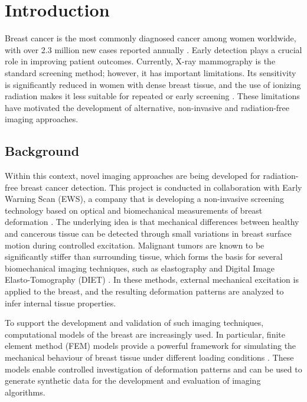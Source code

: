 \section{Introduction}

Breast cancer is the most commonly diagnosed cancer among women worldwide, with over 2.3 million new cases reported annually \cite{WHO2025}. Early detection plays a crucial role in improving patient outcomes. Currently, X-ray mammography is the standard screening method; however, it has important limitations. Its sensitivity is significantly reduced in women with dense breast tissue, and the use of ionizing radiation makes it less suitable for repeated or early screening \cite{VonEuler-Chelpin2019, Bakker2019}. These limitations have motivated the development of alternative, non-invasive and radiation-free imaging approaches.

\subsection{Background}

Within this context, novel imaging approaches are being developed for radiation-free breast cancer detection. This project is conducted in collaboration with Early Warning Scan (EWS), a company that is developing a non-invasive screening technology based on optical and biomechanical measurements of breast deformation \cite{EarlyWarningScanWebsite}. The underlying idea is that mechanical differences between healthy and cancerous tissue can be detected through small variations in breast surface motion during controlled excitation. Malignant tumors are known to be significantly stiffer than surrounding tissue, which forms the basis for several biomechanical imaging techniques, such as elastography and Digital Image Elasto-Tomography (DIET) \cite{Samani2007, Patel2022, Peters2004}. In these methods, external mechanical excitation is applied to the breast, and the resulting deformation patterns are analyzed to infer internal tissue properties.

To support the development and validation of such imaging techniques, computational models of the breast are increasingly used. In particular, finite element method (FEM) models provide a powerful framework for simulating the mechanical behaviour of breast tissue under different loading conditions \cite{Samani2001, Hsu2011}. These models enable controlled investigation of deformation patterns and can be used to generate synthetic data for the development and evaluation of imaging algorithms.

